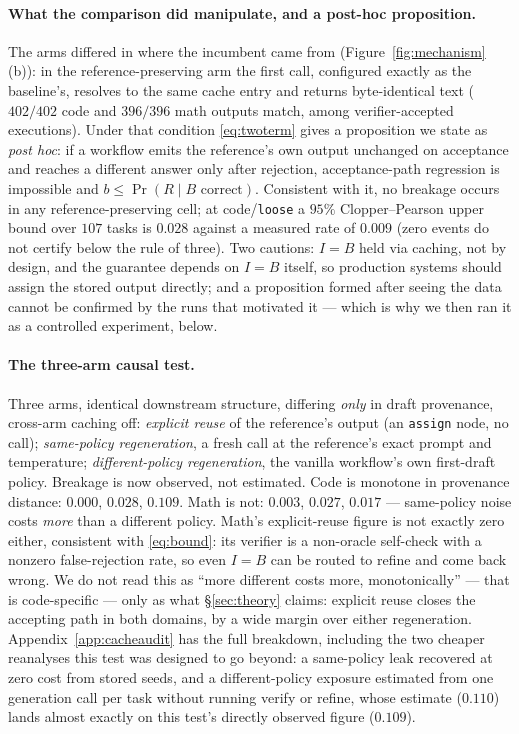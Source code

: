 \documentclass{article}
\newcommand{\brate}{b}
\begin{document}
\paragraph{What the comparison did manipulate, and a post-hoc proposition.} The
arms differed in where the incumbent came from (Figure~\ref{fig:mechanism}(b)):
in the reference-preserving arm the first call, configured exactly as the
baseline's, resolves to the same cache entry and returns byte-identical text
($402/402$ code and $396/396$ math outputs match, among verifier-accepted
executions). Under that condition \eqref{eq:twoterm} gives a proposition we
state as \emph{post hoc}: if a workflow emits the reference's own output
unchanged on acceptance and reaches a different answer only after rejection,
acceptance-path regression is impossible and
$\brate \le \Pr(R \mid B\text{ correct})$. Consistent with it, no breakage
occurs in any reference-preserving cell; at code/\texttt{loose} a $95\%$
Clopper--Pearson upper bound over $107$ tasks is $0.028$ against a measured
rate of $0.009$ (zero events do not certify below the rule of three). Two
cautions: $I=B$ held via caching, not by design, and the guarantee depends on
$I=B$ itself, so production systems should assign the stored output directly;
and a proposition formed after seeing the data cannot be confirmed by the runs
that motivated it --- which is why we then ran it as a controlled experiment,
below.

\paragraph{The three-arm causal test.} Three arms, identical downstream
structure, differing \emph{only} in draft provenance, cross-arm caching off:
\emph{explicit reuse} of the reference's output (an \texttt{assign} node, no
call); \emph{same-policy regeneration}, a fresh call at the reference's exact
prompt and temperature; \emph{different-policy regeneration}, the vanilla
workflow's own first-draft policy. Breakage is now observed, not estimated.
Code is monotone in provenance distance: $0.000$, $0.028$, $0.109$. Math is
not: $0.003$, $0.027$, $0.017$ --- same-policy noise costs \emph{more} than a
different policy. Math's explicit-reuse figure is not exactly zero either,
consistent with \eqref{eq:bound}: its verifier is a non-oracle self-check with
a nonzero false-rejection rate, so even $I=B$ can be routed to refine and come
back wrong. We do not read this as ``more different costs more,
monotonically'' --- that is code-specific --- only as what \S\ref{sec:theory}
claims: explicit reuse closes the accepting path in both domains, by a wide
margin over either regeneration. Appendix~\ref{app:cacheaudit} has the full
breakdown, including the two
cheaper reanalyses this test was designed to go beyond: a same-policy leak
recovered at zero cost from stored seeds, and a different-policy exposure
estimated from one generation call per task without running verify or refine,
whose estimate ($0.110$) lands almost exactly on this test's directly observed
figure ($0.109$).
\end{document}
